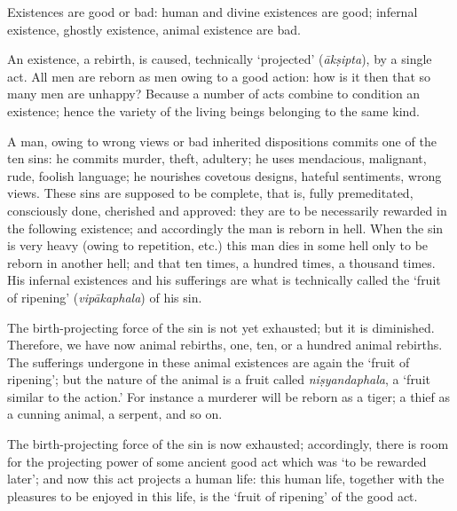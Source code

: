 \documentclass[a4paper, 11pt, oneside, english]{article}
\begin{document}
Existences are good or bad: human and divine existences are good; infernal existence, ghostly existence, animal existence are bad.

An existence, a rebirth, is caused, technically `projected' (\emph{ākṣipta}), by a single act. All men are reborn as men owing to a good action: how is it then that so many men are unhappy? Because a number of acts combine to condition an existence; hence the variety of the living beings belonging to the same kind.

A man, owing to wrong views or bad inherited dispositions commits one of the ten sins: he commits murder, theft, adultery; he uses mendacious, malignant, rude, foolish language; he nourishes covetous designs, hateful sentiments, wrong views. These sins are supposed to be complete, that is, fully premeditated, consciously done, cherished and approved: they are to be necessarily rewarded in the following existence; and accordingly the man is reborn in hell. When the sin is very heavy (owing to repetition, etc.) this man dies in some hell only to be reborn in another hell; and that ten times, a hundred times, a thousand times. His infernal existences and his sufferings are what is technically called the `fruit of ripening' (\emph{vipākaphala}) of his sin.

The birth-projecting force of the sin is not yet exhausted; but it is diminished. Therefore, we have now animal rebirths, one, ten, or a hundred animal rebirths. The sufferings undergone in these animal existences are again the `fruit of ripening'; but the nature of the animal is a fruit called \emph{niṣyandaphala}, a `fruit similar to the action.' For instance a murderer will be reborn as a tiger; a thief as a cunning animal, a serpent, and so on.

The birth-projecting force of the sin is now exhausted; accordingly, there is room for the projecting power of some ancient good act which was `to be rewarded later'; and now this act projects a human life: this human life, together with the pleasures to be enjoyed in this life, is the `fruit of ripening' of the good act.
\end{document}

